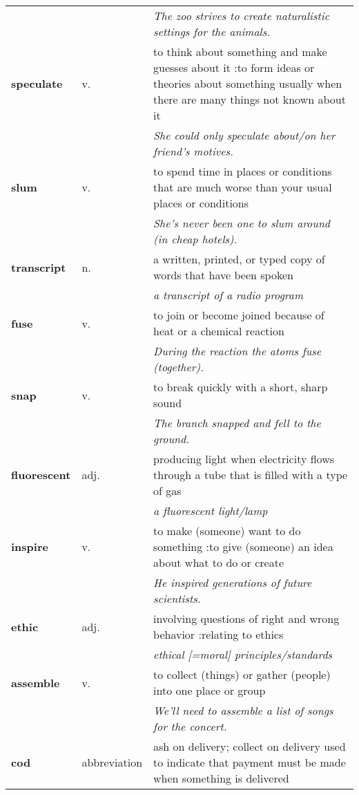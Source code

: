 \documentclass[a4paper]{article}
\begin{document}
\begin{longtable}{llp{11cm}}
 & & \textit{The zoo strives to create naturalistic settings for the animals.}\\[0.08cm]
\textbf{speculate} & v. &  to think about something and make guesses about it :to form ideas or theories about something usually when there are many things not known about it \\
 & & \textit{She could only speculate about/on her friend's motives.}\\[0.08cm]
\textbf{slum} & v. &  to spend time in places or conditions that are much worse than your usual places or conditions \\
 & & \textit{She's never been one to slum around (in cheap hotels).}\\[0.08cm]
\textbf{transcript} & n. &  a written, printed, or typed copy of words that have been spoken \\
 & & \textit{a transcript of a radio program}\\[0.08cm]
\textbf{fuse} & v. &  to join or become joined because of heat or a chemical reaction \\
 & & \textit{During the reaction the atoms fuse (together).}\\[0.08cm]
\textbf{snap} & v. &  to break quickly with a short, sharp sound \\
 & & \textit{The branch snapped and fell to the ground.}\\[0.08cm]
\textbf{fluorescent} & adj. &  producing light when electricity flows through a tube that is filled with a type of gas \\
 & & \textit{a fluorescent light/lamp}\\[0.08cm]
\textbf{inspire} & v. &  to make (someone) want to do something :to give (someone) an idea about what to do or create \\
 & & \textit{He inspired generations of future scientists.}\\[0.08cm]
\textbf{ethic} & adj. &  involving questions of right and wrong behavior :relating to ethics \\
 & & \textit{ethical [=moral] principles/standards}\\[0.08cm]
\textbf{assemble} & v. &  to collect (things) or gather (people) into one place or group \\
 & & \textit{We'll need to assemble a list of songs for the concert.}\\[0.08cm]
\textbf{cod} & abbreviation &  ash on delivery; collect on delivery used to indicate that payment must be made when something is delivered \\

\end{longtable}
\end{document}
